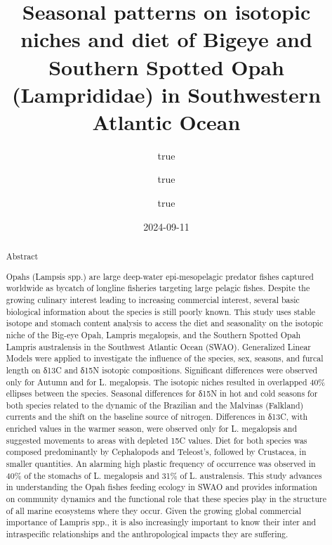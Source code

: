 \documentclass[
  preprint, 3p, authoryear]{article}
\title{Seasonal patterns on isotopic niches and diet of Bigeye and
Southern Spotted Opah (Lamprididae) in Southwestern Atlantic Ocean}
\author{true \and true \and true}
\date{2024-09-11}
\begin{document}
\maketitle
\begin{abstract}
Abstract

Opahs (Lampsis spp.) are large deep-water epi-mesopelagic predator
fishes captured worldwide as bycatch of longline fisheries targeting
large pelagic fishes. Despite the growing culinary interest leading to
increasing commercial interest, several basic biological information
about the species is still poorly known. This study uses stable isotope
and stomach content analysis to access the diet and seasonality on the
isotopic niche of the Big-eye Opah, Lampris megalopsis, and the Southern
Spotted Opah Lampris australensis in the Southwest Atlantic Ocean
(SWAO). Generalized Linear Models were applied to investigate the
influence of the species, sex, seasons, and furcal length on δ13C and
δ15N isotopic compositions. Significant differences were observed only
for Autumn and for L. megalopsis. The isotopic niches resulted in
overlapped 40\% ellipses between the species. Seasonal differences for
δ15N in hot and cold seasons for both species related to the dynamic of
the Brazilian and the Malvinas (Falkland) currents and the shift on the
baseline source of nitrogen. Differences in δ13C, with enriched values
in the warmer season, were observed only for L. megalopsis and suggested
movements to areas with depleted 15C values. Diet for both species was
composed predominantly by Cephalopods and Teleost's, followed by
Crustacea, in smaller quantities. An alarming high plastic frequency of
occurrence was observed in 40\% of the stomachs of L. megalopsis and
31\% of L. australensis. This study advances in understanding the Opah
fishes feeding ecology in SWAO and provides information on community
dynamics and the functional role that these species play in the
structure of all marine ecosystems where they occur. Given the growing
global commercial importance of Lampris spp., it is also increasingly
important to know their inter and intraspecific relationships and the
anthropological impacts they are suffering.
\end{abstract}
\end{document}
